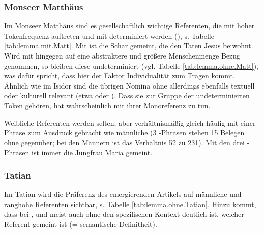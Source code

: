 
\subsubsection{Monseer Matthäus}

Im Monseer Matthäus sind es gesellschaftlich wichtige Referenten, die mit hoher Tokenfrequenz auftreten und mit  determiniert werden (), s. Tabelle \ref{tab:lemma.mit.Matt}. Mit  ist die Schar gemeint, die den Taten Jesus beiwohnt. Wird mit  hingegen auf eine abstraktere und größere Menschenmenge Bezug genommen, so bleiben diese undeterminiert (vgl. Tabelle \ref{tab:lemma.ohne.Matt}), was dafür spricht, dass hier der Faktor Individualität zum Tragen kommt. Ähnlich wie im Isidor sind die übrigen Nomina ohne  allerdings ebenfalls textuell  oder kulturell  relevant (etwa  oder ).  Dass sie zur Gruppe der undeterminierten Token gehören, hat wahrscheinlich mit ihrer Monoreferenz zu tun. 


Weibliche Referenten werden selten, aber verhältnismäßig gleich häufig mit einer -Phrase zum Ausdruck gebracht wie männliche (3 -Phrasen stehen 15 Belegen ohne  gegenüber; bei den Männern ist das Verhältnis 52 zu 231). Mit den drei -Phrasen ist immer die Jungfrau Maria gemeint. 

\subsubsection{Tatian}

Im Tatian wird die Präferenz des emergierenden Artikels auf männliche und ranghohe Referenten  sichtbar, s. Tabelle \ref{tab:lemma.ohne.Tatian}. Hinzu kommt, dass bei ,  und  meist auch ohne den spezifischen Kontext deutlich ist, welcher Referent gemeint ist (= semantische Definitheit).

